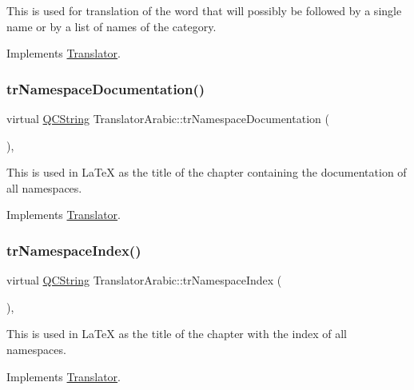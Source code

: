 This is used for translation of the word that will possibly be followed by a single name or by a list of names of the category. 

Implements \mbox{\hyperlink{class_translator}{Translator}}.

\mbox{\label{class_translator_arabic_aa157f3ffdd040f965526955e65f023e6}} 
\subsubsection{\texorpdfstring{trNamespaceDocumentation()}{trNamespaceDocumentation()}}
{\footnotesize\ttfamily virtual \mbox{\hyperlink{class_q_c_string}{Q\+C\+String}} Translator\+Arabic\+::tr\+Namespace\+Documentation (\begin{DoxyParamCaption}{ }\end{DoxyParamCaption})\hspace{0.3cm}{\ttfamily [inline]}, {\ttfamily [virtual]}}

This is used in La\+TeX as the title of the chapter containing the documentation of all namespaces. 

Implements \mbox{\hyperlink{class_translator}{Translator}}.

\mbox{\label{class_translator_arabic_ae9eed5c2d22d24d59a2cb6c0cdca53dd}} 
\subsubsection{\texorpdfstring{trNamespaceIndex()}{trNamespaceIndex()}}
{\footnotesize\ttfamily virtual \mbox{\hyperlink{class_q_c_string}{Q\+C\+String}} Translator\+Arabic\+::tr\+Namespace\+Index (\begin{DoxyParamCaption}{ }\end{DoxyParamCaption})\hspace{0.3cm}{\ttfamily [inline]}, {\ttfamily [virtual]}}

This is used in La\+TeX as the title of the chapter with the index of all namespaces. 

Implements \mbox{\hyperlink{class_translator}{Translator}}.

